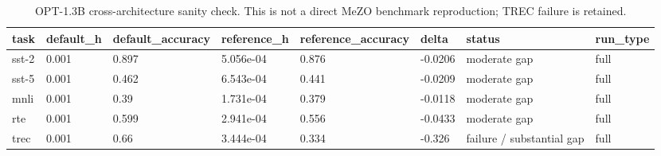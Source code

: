 \begin{table}[t]
\centering
\small
\begin{tabular}{llllllll}
\toprule
task & default\_h & default\_accuracy & reference\_h & reference\_accuracy & delta & status & run\_type \\
\midrule
sst-2 & 0.001 & 0.897 & 5.056e-04 & 0.876 & -0.0206 & moderate gap & full \\
sst-5 & 0.001 & 0.462 & 6.543e-04 & 0.441 & -0.0209 & moderate gap & full \\
mnli & 0.001 & 0.39 & 1.731e-04 & 0.379 & -0.0118 & moderate gap & full \\
rte & 0.001 & 0.599 & 2.941e-04 & 0.556 & -0.0433 & moderate gap & full \\
trec & 0.001 & 0.66 & 3.444e-04 & 0.334 & -0.326 & failure / substantial gap & full \\
\bottomrule
\end{tabular}
\caption{OPT-1.3B cross-architecture sanity check. This is not a direct MeZO benchmark reproduction; TREC failure is retained.}
\label{tab:opt_cross_arch}
\end{table}
